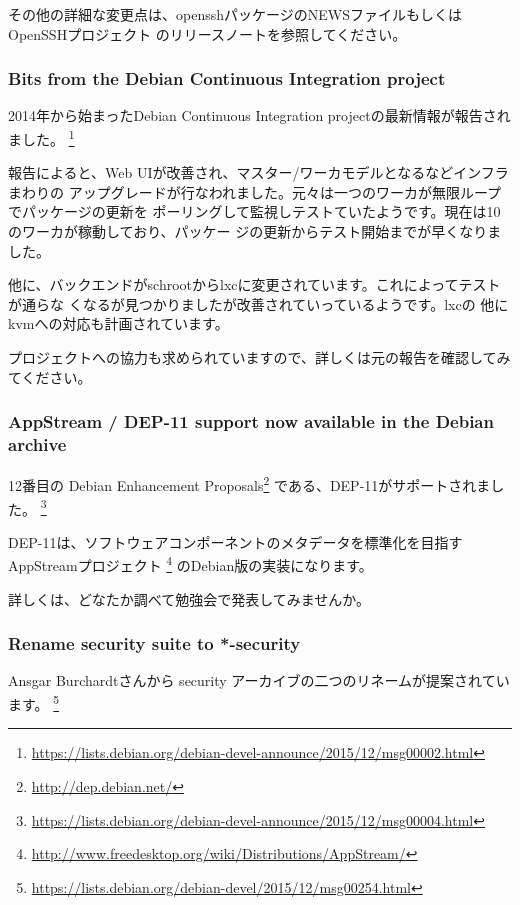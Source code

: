\documentclass[mingoth,a4paper]{jsarticle}
\begin{document}
その他の詳細な変更点は、opensshパッケージのNEWSファイルもしくはOpenSSHプロジェクト
のリリースノートを参照してください。


\subsubsection{Bits from the Debian Continuous Integration project}

2014年から始まったDebian Continuous Integration projectの最新情報が報告されました。
\footnote{\url{https://lists.debian.org/debian-devel-announce/2015/12/msg00002.html}}

報告によると、Web UIが改善され、マスター/ワーカモデルとなるなどインフラまわりの
アップグレードが行なわれました。元々は一つのワーカが無限ループでパッケージの更新を
ポーリングして監視しテストていたようです。現在は10のワーカが稼動しており、パッケー
ジの更新からテスト開始までが早くなりました。

他に、バックエンドがschrootからlxcに変更されています。これによってテストが通らな
くなるが見つかりましたが改善されていっているようです。lxcの
他にkvmへの対応も計画されています。

プロジェクトへの協力も求められていますので、詳しくは元の報告を確認してみてください。


\subsubsection{AppStream / DEP-11 support now available in the Debian archive}

12番目の Debian Enhancement Proposals\footnote{\url{http://dep.debian.net/}}
である、DEP-11がサポートされました。
\footnote{\url{https://lists.debian.org/debian-devel-announce/2015/12/msg00004.html}}

DEP-11は、ソフトウェアコンポーネントのメタデータを標準化を目指すAppStreamプロジェクト
\footnote{\url{http://www.freedesktop.org/wiki/Distributions/AppStream/}}
のDebian版の実装になります。

詳しくは、どなたか調べて勉強会で発表してみませんか。


\subsubsection{Rename security suite to *-security}

Ansgar Burchardtさんから security アーカイブの二つのリネームが提案されています。
\footnote{\url{https://lists.debian.org/debian-devel/2015/12/msg00254.html}}
\end{document}
